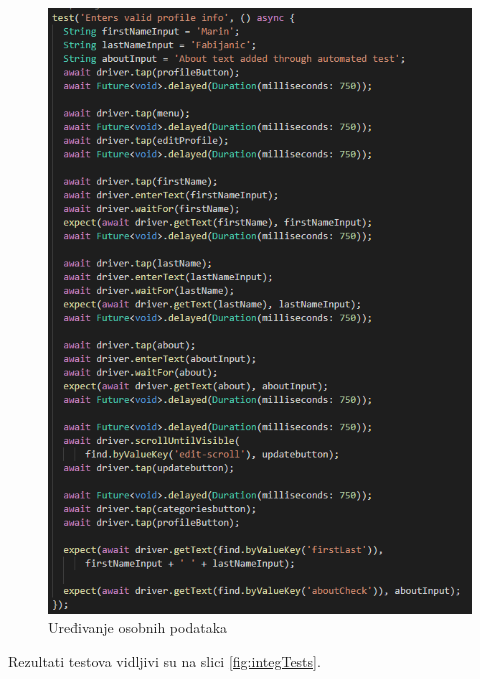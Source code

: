 			\begin{figure}[hbt!]
				\includegraphics[scale=0.47]{slike/editProf.PNG}
				\centering
				\caption{Uređivanje osobnih podataka}
				\label{fig:editProf}
			\end{figure}
			
			
			\eject
			
			Rezultati testova vidljivi su na slici \ref{fig:integTests}.
			
